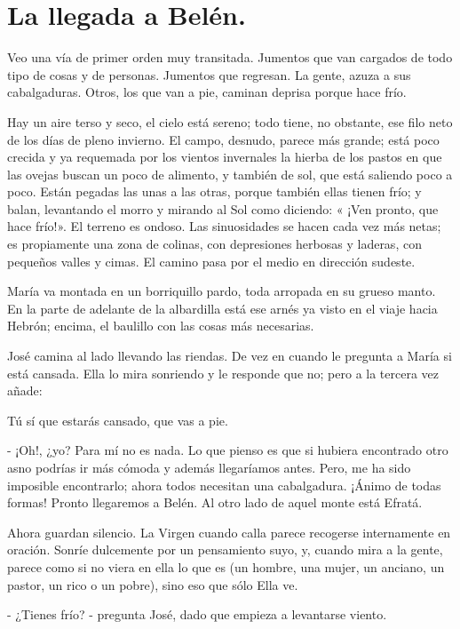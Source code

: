 \documentclass[12pt]{book} %
\begin{document}
\chapter*{La llegada a Belén.}

Veo una vía de primer orden muy transitada. Jumentos que van cargados de todo tipo de cosas y de personas. Jumentos que regresan. La gente, azuza a sus cabalgaduras. Otros, los que van a pie, caminan deprisa porque hace frío. 

Hay un aire terso y seco, el cielo está sereno; todo tiene, no obstante, ese filo neto de los días de pleno invierno. El campo, desnudo, parece más grande; está poco crecida y ya requemada por los vientos invernales la hierba de los pastos en que las ovejas buscan un poco de alimento, y también de sol, que está saliendo poco a poco. Están pegadas las unas a las otras, porque también ellas tienen frío; y balan, levantando el morro y mirando al Sol como diciendo: « ¡Ven pronto, que hace frío!». El terreno es ondoso. Las sinuosidades se hacen cada vez más netas; es propiamente una zona de colinas, con depresiones herbosas y laderas, con pequeños valles y cimas. El camino pasa por el medio en dirección sudeste. 

María va montada en un borriquillo pardo, toda arropada en su grueso manto. En la parte de adelante de la albardilla está ese arnés ya visto en el viaje hacia Hebrón; encima, el baulillo con las cosas más necesarias. 

José camina al lado llevando las riendas. De vez en cuando le pregunta a María si está cansada. Ella lo mira sonriendo y le responde que no; pero a la tercera vez añade: 

Tú sí que estarás cansado, que vas a pie. 

- ¡Oh!, ¿yo? Para mí no es nada. Lo que pienso es que si hubiera encontrado otro asno podrías ir más cómoda y además llegaríamos antes. Pero, me ha sido imposible encontrarlo; ahora todos necesitan una cabalgadura. ¡Ánimo de todas formas! Pronto llegaremos a Belén. Al otro lado de aquel monte está Efratá. 

Ahora guardan silencio. La Virgen cuando calla parece recogerse internamente en oración. Sonríe dulcemente por un pensamiento suyo, y, cuando mira a la gente, parece como si no viera en ella lo que es (un hombre, una mujer, un anciano, un pastor, un rico o un pobre), sino eso que sólo Ella ve. 

- ¿Tienes frío? - pregunta José, dado que empieza a levantarse viento. 
\end{document}
